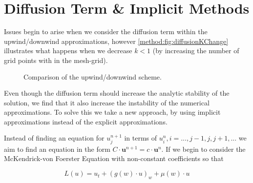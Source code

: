 \documentclass[../main.tex]{subfiles}
\begin{document}
  \section{Diffusion Term \& Implicit Methods}
  Issues begin to arise when we consider the diffusion term within the upwind/downwind approximations, however \autoref{method:fig:diffusionKChange} illustrates what happens when we decrease $k < 1$ (by increasing the number of grid points with in the mesh-grid).

  \begin{figure}[htb]
    \centering
    \caption{\label{method:fig:diffusionKChange} Comparison of the upwind/downwind scheme.}
  \end{figure}

  Even though the diffusion term should increase the analytic stability of the solution, we find that it also increase the instability of the numerical approximations. To solve this we take a new approach, by using implicit approximations instead of the explicit approximations.

  Instead of finding an equation for $u^{n+1}_j$ in terms of $u^n_i, i = ..., j-1, j, j+1, ... $ we aim to find an equation in the form $C \cdot \textbf{u}^{n+1} = c \cdot \textbf{u}^n$. If we begin to consider the McKendrick-von Foerster Equation with non-constant coefficients so that

  \begin{equation}
    L(u) = u_t + (g(w) \cdot u)_w + \mu(w) \cdot u
  \end{equation}
\end{document}
